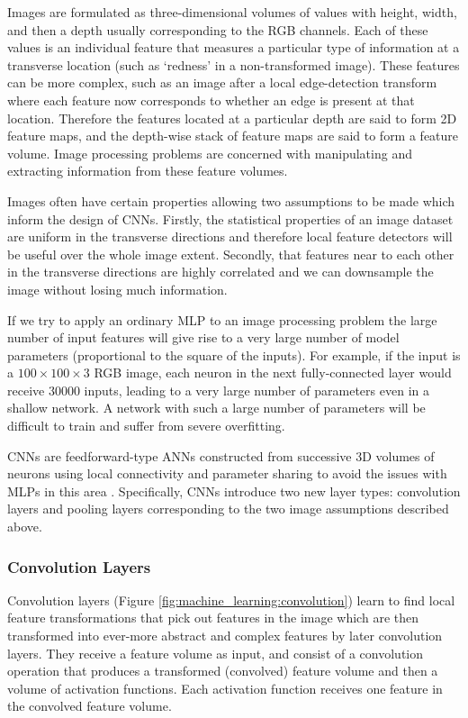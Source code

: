Images are formulated as three-dimensional volumes of values with height, width, and then a depth usually corresponding to the RGB channels. 
Each of these values is an individual feature that measures a particular type of information at a transverse location (such as `redness' in a non-transformed image). 
These features can be more complex, such as an image after a local edge-detection transform where each feature now corresponds to whether an edge is present at that location. 
Therefore the features located at a particular depth are said to form 2D feature maps, and the depth-wise stack of feature maps are said to form a feature volume. 
Image processing problems are concerned with manipulating and extracting information from these feature volumes.

Images often have certain properties allowing two assumptions to be made which inform the design of CNNs. 
Firstly, the statistical properties of an image dataset are uniform in the transverse directions and therefore local feature detectors will be useful over the whole image extent. 
Secondly, that features near to each other in the transverse directions are highly correlated and we can downsample the image without losing much information. 


If we try to apply an ordinary MLP to an image processing problem the large number of input features will give rise to a very large number of model parameters (proportional to the square of the inputs). 
For example, if the input is a $100\times{}100\times{}3$ RGB image, each neuron in the next fully-connected layer would receive $30000$ inputs, leading to a very large number of parameters even in a shallow network. A network with such a large number of parameters will be difficult to train and suffer from severe overfitting.

CNNs are feedforward-type ANNs constructed from successive 3D volumes of neurons using local connectivity and parameter sharing to avoid the issues with MLPs in this area \cite{CS231n}. Specifically, CNNs introduce two new layer types: convolution layers and pooling layers corresponding to the two image assumptions described above.



\subsubsection{Convolution Layers}
Convolution layers (Figure \ref{fig:machine_learning:convolution}) learn to find local feature transformations that pick out features in the image which are then transformed into ever-more abstract and complex features by later convolution layers. 
They receive a feature volume as input, and consist of a convolution operation that produces a transformed (convolved) feature volume and then a volume of activation functions. 
Each activation function receives one feature in the convolved feature volume.  


